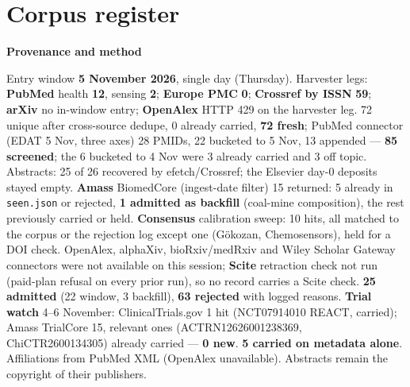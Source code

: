 \documentclass[10pt]{article}
\begin{document}
\clearpage
\section*{\sffamily\bfseries\color{Deep}Corpus register}
\vspace{-1.5mm}{\color{Amber}\rule{\linewidth}{1.1pt}}\vspace{2.5mm}



\vspace{2mm}

\begin{keybox}
{\sffamily\bfseries\footnotesize\color{Deep}Provenance and method}\\[1.2mm]
{\fontsize{7.2}{8.8}\selectfont
Entry window \textbf{5 November 2026}, single day (Thursday). Harvester legs: \textbf{PubMed} health \textbf{12}, sensing \textbf{2}; \textbf{Europe PMC} \textbf{0}; \textbf{Crossref by ISSN} \textbf{59}; \textbf{arXiv} no in-window entry; \textbf{OpenAlex} HTTP 429 on the harvester leg. 72 unique after cross-source dedupe, 0 already carried, \textbf{72 fresh}; PubMed connector (EDAT 5 Nov, three axes) 28 PMIDs, 22 bucketed to 5 Nov, 13 appended --- \textbf{85 screened}; the 6 bucketed to 4 Nov were 3 already carried and 3 off topic. Abstracts: 25 of 26 recovered by efetch/Crossref; the Elsevier day-0 deposits stayed empty.
\textbf{Amass} BiomedCore (ingest-date filter) 15 returned: 5 already in \texttt{seen.json} or rejected, \textbf{1 admitted as backfill} (coal-mine composition), the rest previously carried or held. \textbf{Consensus} calibration sweep: 10 hits, all matched to the corpus or the rejection log except one (Gökozan, Chemosensors), held for a DOI check. OpenAlex, alphaXiv, bioRxiv/medRxiv and Wiley Scholar Gateway connectors were not available on this session; \textbf{Scite} retraction check not run (paid-plan refusal on every prior run), so no record carries a Scite check.
\textbf{25 admitted} (22 window, 3 backfill), \textbf{63 rejected} with logged reasons. \textbf{Trial watch} 4--6 November: ClinicalTrials.gov 1 hit (NCT07914010 REACT, carried); Amass TrialCore 15, relevant ones (ACTRN12626001238369, ChiCTR2600134305) already carried --- \textbf{0 new}. \textbf{5 carried on metadata alone}. Affiliations from PubMed XML (OpenAlex unavailable).
Abstracts remain the copyright of their publishers.\par}
\end{keybox}
\end{document}
